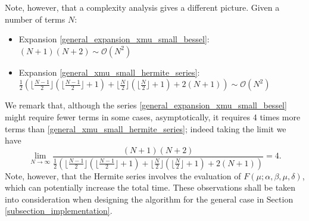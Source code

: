 \documentclass[10pt,a4paper,oneside]{article}
\numberwithin{equation}{section}
\begin{document}
\begin{table}[htp]
	\centering
	\caption{Comparison on the number of terms to achieve machine precision with the three series expansions for $|x-\mu| \to 0$.}
	\label{table_xmu_general_n_terms}
\end{table}

Note, however, that a complexity analysis gives a different picture. Given a number of terms $N$:
\begin{itemize}
\item Expansion \eqref{general_expansion_xmu_small_bessel}: $(N + 1) (N + 2) \sim \mathcal{O}(N^2)$
\item Expansion \eqref{general_xmu_small_hermite_series}: $\frac{1}{2}\left(\lfloor\frac{N - 1}{2} \rfloor \left(\lfloor\frac{N - 1}{2} \rfloor + 1\right) + \lfloor\frac{N}{2} \rfloor \left(\lfloor\frac{N}{2} \rfloor + 1\right) + 2 (N + 1)\right) \sim \mathcal{O}(N^2)$
\end{itemize}
We remark that, although the series \eqref{general_expansion_xmu_small_bessel} might require fewer terms in some cases, asymptotically, it requires 4 times more terms than \eqref{general_xmu_small_hermite_series}; indeed taking the limit we have
\begin{equation*}
\lim_{N\to\infty} \frac{(N + 1) (N + 2)}{\frac{1}{2}\left(\lfloor\frac{N - 1}{2} \rfloor \left(\lfloor\frac{N - 1}{2} \rfloor + 1\right) + \lfloor\frac{N}{2} \rfloor \left(\lfloor\frac{N}{2} \rfloor + 1\right) + 2 (N + 1)\right)} = 4.
\end{equation*}
Note, however, that the Hermite series involves the evaluation of $F(\mu; \alpha, \beta, \mu, \delta)$, which can potentially increase the total time. These observations shall be taken into consideration when designing the algorithm for the general case in Section \ref{subsection_implementation}.
\end{document}

